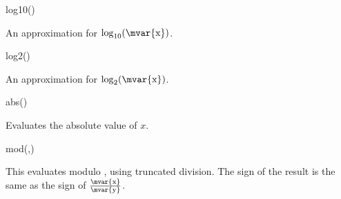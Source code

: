 \begin{math-function}{log10()}

	An approximation for $\log_{10}(\textrm{\mvar{x}})$.

\begin{codeexample}[]
 \pgfmathresult
\end{codeexample}

\end{math-function}

\begin{math-function}{log2()}

	An approximation for $\log_2(\textrm{\mvar{x}})$.

\begin{codeexample}[]
 \pgfmathresult
\end{codeexample}

\end{math-function}

\begin{math-function}{abs()}
\mathcommand

	Evaluates the absolute value of $x$.
	
\begin{codeexample}[]
 \pgfmathresult
\end{codeexample}

\begin{codeexample}[]
 \pgfmathresult
\end{codeexample}
\end{math-function}

\begin{math-function}{mod(,)}
\mathcommand

	This evaluates  modulo , using truncated division.
	The sign of the result is the same as the sign of
	$\frac{\textrm{\mvar{x}}}{\textrm{\mvar{y}}}$.

\begin{codeexample}[]
 \pgfmathresult
\end{codeexample}

\begin{codeexample}[]
 \pgfmathresult
\end{codeexample}

\end{math-function}

